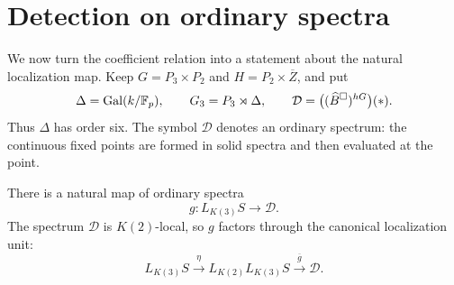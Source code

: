 \section{Detection on ordinary spectra}
\label{sec:detection}

We now turn the coefficient relation into a statement about the natural
localization map.  Keep $G=P_3\times P_2$ and
$H=P_2\times\overline Z$, and put
\[
 \Delta=\operatorname{Gal}(k/\mathbb F_p),\qquad
 G_3=P_3\rtimes\Delta,\qquad
 \mathcal D=\bigl((\widehat B^{\square})^{hG}\bigr)(*).
\]
Thus $\Delta$ has order six.  The symbol $\mathcal D$ denotes an ordinary spectrum:
the continuous fixed points are formed in solid spectra and then evaluated
at the point.

\begin{lemma}\label{lem:local-detector}
There is a natural map of ordinary spectra
\begin{equation}\label{eq:ordinary-detector}
 g:L_{K(3)}S\longrightarrow\mathcal D.
\end{equation}
The spectrum $\mathcal D$ is $K(2)$-local, so $g$ factors through the canonical
localization unit:
\begin{equation}\label{eq:detector-factorization}
 L_{K(3)}S\xrightarrow{\eta}L_{K(2)}L_{K(3)}S
       \xrightarrow{\overline g}\mathcal D.
\end{equation}
\end{lemma}

